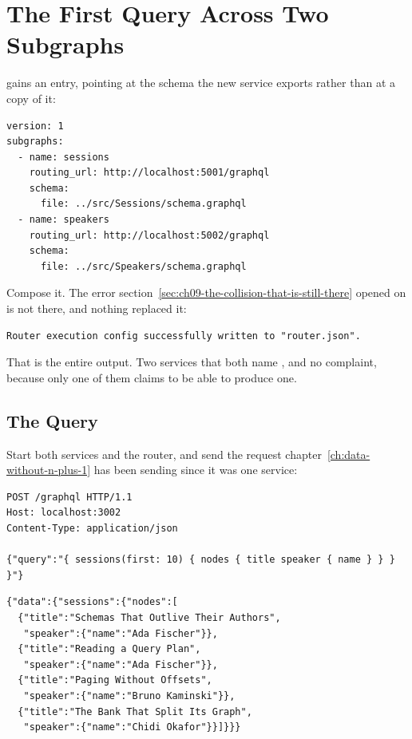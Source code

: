 \section{The First Query Across Two Subgraphs}
\label{sec:ch09-the-first-query-across-two}

%
 gains an entry, pointing at the schema the new service
exports rather than at a copy of it:

\begin{verbatim}
version: 1
subgraphs:
  - name: sessions
    routing_url: http://localhost:5001/graphql
    schema:
      file: ../src/Sessions/schema.graphql
  - name: speakers
    routing_url: http://localhost:5002/graphql
    schema:
      file: ../src/Speakers/schema.graphql
\end{verbatim}

%
Compose it. The error section~\ref{sec:ch09-the-collision-that-is-still-there}
opened on is not there, and nothing replaced it:

\begin{verbatim}
Router execution config successfully written to "router.json".
\end{verbatim}

%
That is the entire output. Two services that both name , and no
complaint, because only one of them claims to be able to produce one.

\subsection{The Query}

%
Start both services and the router, and send the request
chapter~\ref{ch:data-without-n-plus-1} has been sending since it was one
service:

\begin{verbatim}
POST /graphql HTTP/1.1
Host: localhost:3002
Content-Type: application/json

{"query":"{ sessions(first: 10) { nodes { title speaker { name } } } }"}
\end{verbatim}

\begin{verbatim}
{"data":{"sessions":{"nodes":[
  {"title":"Schemas That Outlive Their Authors",
   "speaker":{"name":"Ada Fischer"}},
  {"title":"Reading a Query Plan",
   "speaker":{"name":"Ada Fischer"}},
  {"title":"Paging Without Offsets",
   "speaker":{"name":"Bruno Kaminski"}},
  {"title":"The Bank That Split Its Graph",
   "speaker":{"name":"Chidi Okafor"}}]}}}
\end{verbatim}

